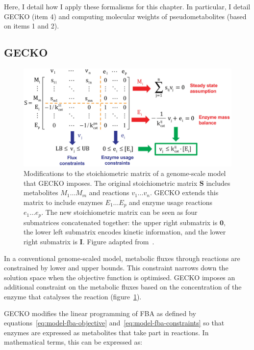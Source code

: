 Here, I detail how I apply these formalisms for this chapter.
In particular, I detail GECKO (item 4) and computing molecular weights of pseudometabolites (based on items 1 and 2).


\subsection{GECKO}
\label{subsec:model-yeast8-gecko}

\begin{figure}
  \centering
  \includegraphics[width=0.9\linewidth]{sanchezImprovingPhenotypePredictions2017_1b_adapted}
  \caption{
    Modifications to the stoichiometric matrix of a genome-scale model that GECKO imposes.
    The original stoichiometric matrix $\mathbf{S}$ includes metabolites $M_{1} \ldots M_{m}$ and reactions $v_{1} \ldots v_{n}$.
    GECKO extends this matrix to include enzymes $E_{1} \ldots E_{p}$ and enzyme usage reactions $e_{1} \ldots e_{p}$.
    The new stoichiometric matrix can be seen as four submatrices concatenated together: the upper right submatrix is $\mathbf{0}$, the lower left submatrix encodes kinetic information, and the lower right submatrix is $\mathbf{I}$.
    Figure adapted from~\textcite{sanchezImprovingPhenotypePredictions2017}.
  }
  \label{fig:model-gecko}
\end{figure}

In a conventional genome-scaled model, metabolic fluxes through reactions are constrained by lower and upper bounds.
This constraint narrows down the solution space when the objective function is optimised.
GECKO imposes an additional constraint on the metabolic fluxes based on the concentration of the enzyme that catalyses the reaction (figure~\ref{fig:model-gecko}).

GECKO modifies the linear programming of FBA as defined by equations~\ref{eq:model-fba-objective} and~\ref{eq:model-fba-constraints} so that enzymes are expressed as metabolites that take part in reactions.
In mathematical terms, this can be expressed as:

